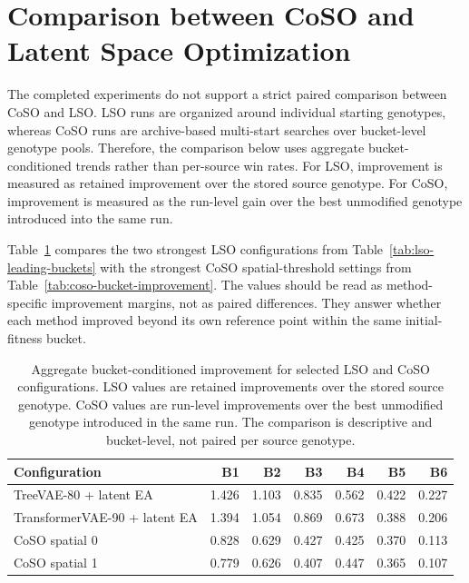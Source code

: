 \section{Comparison between CoSO and Latent Space Optimization}
\label{sec:Comparison between CoSO and Latent Space Optimization}

The completed experiments do not support a strict paired comparison between CoSO and LSO. LSO runs are organized around individual starting genotypes, whereas CoSO runs are archive-based multi-start searches over bucket-level genotype pools. Therefore, the comparison below uses aggregate bucket-conditioned trends rather than per-source win rates. For LSO, improvement is measured as retained improvement over the stored source genotype. For CoSO, improvement is measured as the run-level gain over the best unmodified genotype introduced into the same run.

Table~\ref{tab:coso-lso-bucket-improvement} compares the two strongest LSO configurations from Table~\ref{tab:lso-leading-buckets} with the strongest CoSO spatial-threshold settings from Table~\ref{tab:coso-bucket-improvement}. The values should be read as method-specific improvement margins, not as paired differences. They answer whether each method improved beyond its own reference point within the same initial-fitness bucket.

\begin{table}[H]
\centering
\caption{Aggregate bucket-conditioned improvement for selected LSO and CoSO configurations. LSO values are retained improvements over the stored source genotype. CoSO values are run-level improvements over the best unmodified genotype introduced in the same run. The comparison is descriptive and bucket-level, not paired per source genotype.}
\label{tab:coso-lso-bucket-improvement}
{\small
\begin{tabular}{lrrrrrr}
\hline
Configuration & B1 & B2 & B3 & B4 & B5 & B6 \\
\hline
TreeVAE-80 + latent EA & 1.426 & 1.103 & 0.835 & 0.562 & 0.422 & 0.227 \\
TransformerVAE-90 + latent EA & 1.394 & 1.054 & 0.869 & 0.673 & 0.388 & 0.206 \\
CoSO spatial 0 & 0.828 & 0.629 & 0.427 & 0.425 & 0.370 & 0.113 \\
CoSO spatial 1 & 0.779 & 0.626 & 0.407 & 0.447 & 0.365 & 0.107 \\
\hline
\end{tabular}}
\end{table}

